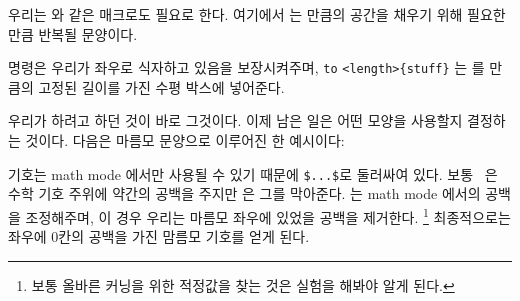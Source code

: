 우리는  와 같은 매크로도 필요로 한다.
여기에서 는  만큼의 공간을 채우기 위해 필요한 만큼
반복될 문양이다.
\begin{lcode}
\newcommand{\chain}[2]{\leavevmode\hbox to #2{\motif{#1}}}
\end{lcode}
\cmd{\leavevmode} 명령은 우리가 좌우로 식자하고 있음을 보장시켜주며,
\cmd{\hbox} \verb?to? \verb?<length>{stuff}? 는  를
 만큼의 고정된 길이를 가진 수평 박스에 넣어준다.

우리가 하려고 하던 것이 바로 그것이다.
이제 남은 일은 어떤 모양을 사용할지 결정하는 것이다.
다음은 마름모 문양으로 이루어진 한 예시이다:
\begin{lcode}
\makeatletter
\newcommand{\diamonds}{\m@th$\mkern-.6mu \diamond \mkern-.6mu$}
\makeatother
\end{lcode}
\cmd{\diamond} 기호는 math mode 에서만 사용될 수 있기 때문에
\verb?$...$?로 둘러싸여 있다. 
보통 \tx\ 은 수학 기호 주위에 약간의 공백을 주지만 \cmd{\m@th}은 그를 막아준다.
\cmd{\mkern}는 math mode 에서의 공백을 조정해주며,
이 경우 우리는 마름모 좌우에 있었을 공백을 제거한다.
\footnote{보통 올바른 커닝\label{fn:kerning}을 위한 적정값을 찾는 것은 실험을 해봐야 알게 된다.}
최종적으로는 좌우에 0칸의 공백을 가진 맘름모 기호를 얻게 된다.

